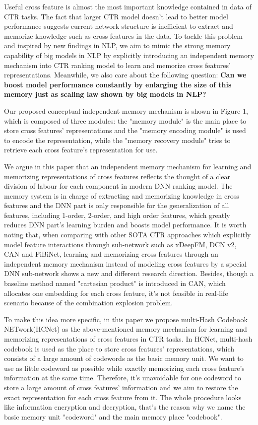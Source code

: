\documentclass[sigconf,authorversion]{acmart}
\begin{document}
Useful cross feature is almost the most important knowledge contained in data of CTR tasks. The fact that larger CTR model doesn't lead to better model performance suggests current network structure is inefficient to extract and memorize knowledge such as cross features in the data. To tackle this problem and inspired by new findings in NLP,  we aim to mimic the strong memory capability of big models in NLP by explicitly introducing an independent memory mechanism into CTR ranking model to learn and memorize cross features' representations. Meanwhile, we also care about the following question: \textbf{Can we boost model performance constantly by enlarging the size of this memory just as scaling law shown by big models in NLP? }

Our proposed conceptual independent memory mechanism is shown in Figure 1, which is composed of three modules: the "memory module" is the main place to store cross features' representations and the "memory encoding module" is used to encode the representation, while the "memory recovery module" tries to retrieve each cross feature's representation for use. 

We argue in this paper that an independent memory mechanism for learning and memorizing representations of cross features reflects the thought of a clear division of labour for each component in modern DNN ranking model. The memory system is in charge of extracting and memorizing knowledge in cross features and the DNN part is only responsible for the generalization of all features, including 1-order, 2-order, and high order features, which greatly reduces DNN part's learning burden and boosts model performance. It is worth noting that, when comparing with other SOTA CTR approaches which explicitly model feature interactions through sub-network such as xDeepFM\cite{lian2018xdeepfm},  DCN v2\cite{WangSCJLHC21}, CAN\cite{zhou2020can} and FiBiNet\cite{HuangZZ19}, learning and memorizing cross features through an independent memory mechanism instead of modeling cross features by a special DNN sub-network shows a new and different research direction. Besides, though a baseline method named "cartesian product" is introduced in CAN\cite{zhou2020can}, which allocates one embedding for each cross feature, it's not feasible in real-life scenario because of the combination explosion problem.

To make this idea more specific, in this paper we propose multi-Hash Codebook NETwork(HCNet) as the above-mentioned memory mechanism for learning and memorizing representations of cross features in CTR tasks. In HCNet, multi-hash codebook is used as the place to store cross features' representations, which consists of a large amount of codewords as the basic memory unit.  We want to use as little codeword as possible while exactly memorizing each cross feature's information at the same time. Therefore, it's unavoidable for one codeword to store a large amount of cross features' information and we aim to restore the exact representation for each cross feature from it. The whole procedure looks like information encryption and decryption, that's the reason why we name the basic memory unit "codeword" and the main memory place "codebook".
\end{document}

